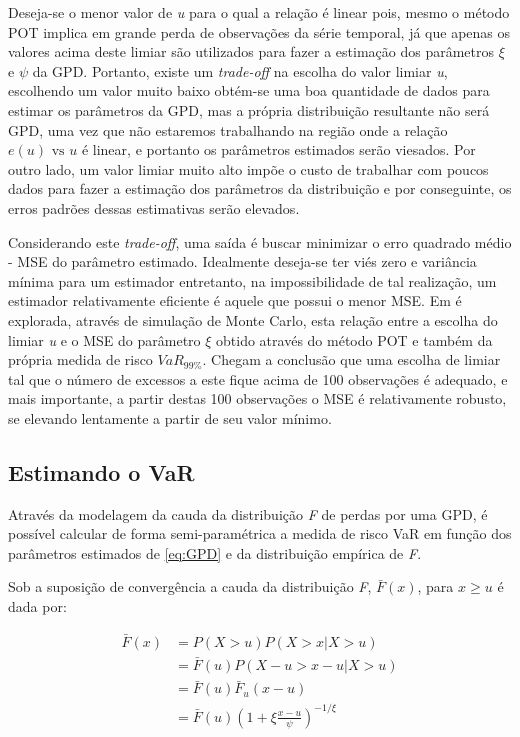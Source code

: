 \documentclass[1p]{elsarticle}
\theoremstyle{definition}
\begin{document}
Deseja-se o menor valor de \emph{u} para o qual a relação é linear pois, mesmo o método POT implica em grande perda de observações da série temporal, já que apenas os valores acima deste limiar são utilizados para fazer a estimação dos parâmetros $\xi$ e $\psi$ da GPD. Portanto, existe um \emph{trade-off} na escolha do valor limiar \emph{u}, escolhendo um valor muito baixo obtém-se uma boa quantidade de dados para estimar os parâmetros da GPD, mas a própria distribuição resultante não será GPD, uma vez que não estaremos trabalhando na região onde a relação $e(u) \text{ vs } u$ é linear, e portanto os parâmetros estimados serão viesados. Por outro lado, um valor limiar muito alto impõe o custo de trabalhar com poucos dados para fazer a estimação dos parâmetros da distribuição e por conseguinte, os erros padrões dessas estimativas serão elevados.

Considerando este \emph{trade-off}, uma saída é buscar minimizar o erro quadrado médio - MSE do parâmetro estimado. Idealmente deseja-se ter viés zero e variância mínima para um estimador entretanto, na impossibilidade de tal realização, um estimador relativamente eficiente é aquele que possui o menor MSE. Em \cite[seção 5.2.5, p. ~161-162]{McNeil2015} é explorada, através de simulação de Monte Carlo, esta relação entre a escolha do limiar \emph{u} e o MSE do parâmetro $\xi$ obtido através do método POT e também da própria medida de risco $VaR_{99\%}$. Chegam a conclusão que uma escolha de limiar tal que o número de excessos a este fique acima de 100 observações é adequado, e mais importante, a partir destas 100 observações o MSE é relativamente robusto, se elevando lentamente a partir de seu valor mínimo.

\subsection{Estimando o VaR}
\label{sec:var}

Através da modelagem da cauda da distribuição \emph{F} de perdas por uma GPD, é possível calcular de forma semi-paramétrica a medida de risco VaR em função dos parâmetros estimados de \eqref{eq:GPD} e da distribuição empírica de \emph{F}.

Sob a suposição de convergência a cauda da distribuição \emph{F}, $\bar{F}(x)$, para $x \geq u$ é dada por:

\begin{align}
\label{eq:Ftail}
\bar{F}(x) & = P(X>u)P(X>x|X>u) \nonumber \\
& = \bar{F}(u) P(X-u>x-u|X>u) \nonumber \\
& = \bar{F}(u)\bar{F}_u(x-u) \nonumber \\
& = \bar{F}(u)\left(1+\xi \frac{x-u}{\psi}\right)^{-1/\xi}
\end{align}
\end{document}
